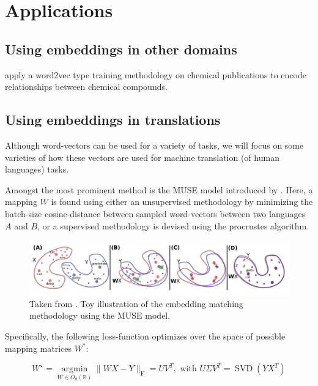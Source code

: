\documentclass[a4paper,12pt,twoside,openright]{report}
\begin{document}
\chapter{Applications}\label{AppendixApplication}

\section{Using embeddings in other domains}

\cite{tshitoyan19} apply a word2vec type training methodology on chemical publications to encode relationships between chemical compounds.


\section{Using embeddings in translations}


Although word-vectors can be used for a variety of tasks, we will focus on some varieties of how these vectors are used for machine translation (of human languages) tasks.

Amongst the most prominent method is the MUSE model introduced by \cite{conneau17}.
Here, a mapping $W$ is found using either an unsupervised methodology by minimizing the batch-size cosine-distance between sampled word-vectors between two languages $A$ and $B$, or a supervised methodology is devised using the procrustes algorithm.

\begin{figure}[h]
	\center
  \includegraphics[width=\linewidth]{./assets/relatedwork/muse.png}
  \caption{Taken from \cite{conneau17}. Toy illustration of the embedding matching methodology using the MUSE model.}
  \label{fig:muse_translation}
\end{figure}

Specifically, the following loss-function optimizes over the space of possible mapping matrices $W^*$:

\begin{equation}
W^{\star}=\underset{W \in O_{d}(\mathbb{R})}{\operatorname{argmin}}\|W X-Y\|_{\mathrm{F}}=U V^{T}, \text { with } U \Sigma V^{T}=\operatorname{SVD}\left(Y X^{T}\right)
\end{equation}
\end{document}
